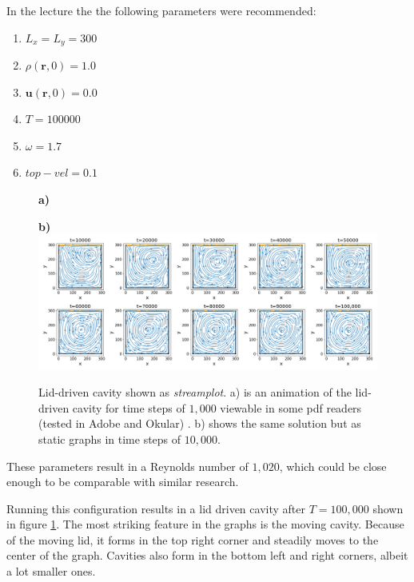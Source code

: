 \documentclass[a4paper,12pt, oneside]{book}
\begin{document}
In the lecture the the following parameters were recommended:
\begin{enumerate}
    \item $L_x = L_y = 300$
    \item $\rho(\textbf{r},0) = 1.0$
    \item $\textbf{u}(\textbf{r},0) = 0.0$
    \item $T = 100000$
    \item $\omega = 1.7$
    \item $top-vel = 0.1$
\end{enumerate}
\clearpage
\begin{figure}[ht]
\centering
\textbf{\large a)}
\vspace*{2mm}

\textbf{\large b)}
\includegraphics[width=\columnwidth]{milestones/final/img/m6-1-vels.png}
\caption[Lid-driven cavity]{Lid-driven cavity shown as \textit{streamplot}. a) is an animation of the lid-driven cavity for time steps of $1,000$ viewable in some pdf readers (tested in Adobe and Okular) . b) shows the same solution but as static graphs in time steps of $10,000$. }
\label{fig:m6-1}
\end{figure}
\clearpage
These parameters result in a Reynolds number of $1,020$, which could be close enough to be comparable with similar research.

Running this configuration results in a lid driven cavity  after $T=100,000$ shown in figure \ref{fig:m6-1}.
The most striking feature in the graphs is the moving cavity. Because of the moving lid, it forms in the top right corner and steadily moves to the center of the graph. 
Cavities also form in the bottom left and right corners, albeit a lot smaller ones. 
\end{document}
